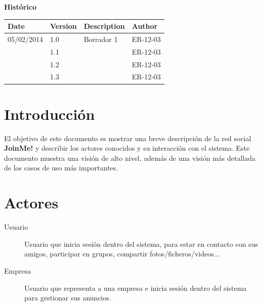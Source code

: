 \documentclass[12pt, a4paper, titlepage]{article}
\begin{document}
\begin{titlepage}
\vspace{2cm}
\begin{center}
	\large{\textbf{Histórico}}
	
    \begin{tabular}{ | p{4cm} | p{2cm} | p{5cm} | p{4cm} |}
    \hline
    \textbf{Date} & \textbf{Version} & \textbf{Description} & \textbf{Author} \\ \hline
    05/02/2014 & 1.0 & Borrador 1  & ER-12-03  \\ \hline
     & 1.1 &  & ER-12-03  \\ \hline
     & 1.2 &  & ER-12-03  \\ \hline
     & 1.3 &  & ER-12-03  \\ \hline
    \end{tabular}
\end{center}

\end{titlepage}
\clearpage


\tableofcontents
\clearpage

\section{Introducción}

El objetivo de este documento es mostrar una breve descripción de la red social \textbf{JoinMe!} y describir los actores conocidos y su interacción con el sistema.
Este documento muestra una visión de alto nivel, además de una visión más detallada de los casos de uso más importantes.

\section{Actores}
\begin{description}

\item [Usuario] Usuario que inicia sesión dentro del sistema, para estar en contacto con sus amigos, participar en grupos, compartir fotos/ficheros/videos...

\item [Empresa] Usuario que representa a una empresa e inicia sesión dentro del sistema para gestionar sus anuncios.

\end{description}
\end{document}
